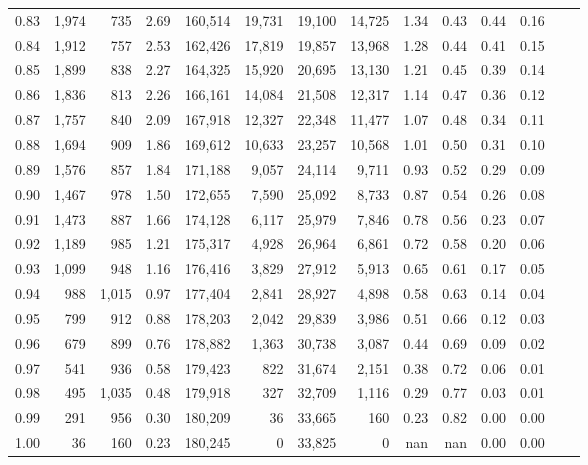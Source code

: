 \begin{tabular}{rrrrrrrrrrrrrr}
0.83 &  1,974 &    735 &    2.69 &  160,514 &   19,731 &  19,100 &  14,725 &  1.34 &  0.43 &  0.44 &      0.16 \\
0.84 &  1,912 &    757 &    2.53 &  162,426 &   17,819 &  19,857 &  13,968 &  1.28 &  0.44 &  0.41 &      0.15 \\
0.85 &  1,899 &    838 &    2.27 &  164,325 &   15,920 &  20,695 &  13,130 &  1.21 &  0.45 &  0.39 &      0.14 \\
0.86 &  1,836 &    813 &    2.26 &  166,161 &   14,084 &  21,508 &  12,317 &  1.14 &  0.47 &  0.36 &      0.12 \\
0.87 &  1,757 &    840 &    2.09 &  167,918 &   12,327 &  22,348 &  11,477 &  1.07 &  0.48 &  0.34 &      0.11 \\
0.88 &  1,694 &    909 &    1.86 &  169,612 &   10,633 &  23,257 &  10,568 &  1.01 &  0.50 &  0.31 &      0.10 \\
0.89 &  1,576 &    857 &    1.84 &  171,188 &    9,057 &  24,114 &   9,711 &  0.93 &  0.52 &  0.29 &      0.09 \\
0.90 &  1,467 &    978 &    1.50 &  172,655 &    7,590 &  25,092 &   8,733 &  0.87 &  0.54 &  0.26 &      0.08 \\
0.91 &  1,473 &    887 &    1.66 &  174,128 &    6,117 &  25,979 &   7,846 &  0.78 &  0.56 &  0.23 &      0.07 \\
0.92 &  1,189 &    985 &    1.21 &  175,317 &    4,928 &  26,964 &   6,861 &  0.72 &  0.58 &  0.20 &      0.06 \\
0.93 &  1,099 &    948 &    1.16 &  176,416 &    3,829 &  27,912 &   5,913 &  0.65 &  0.61 &  0.17 &      0.05 \\
0.94 &    988 &  1,015 &    0.97 &  177,404 &    2,841 &  28,927 &   4,898 &  0.58 &  0.63 &  0.14 &      0.04 \\
0.95 &    799 &    912 &    0.88 &  178,203 &    2,042 &  29,839 &   3,986 &  0.51 &  0.66 &  0.12 &      0.03 \\
0.96 &    679 &    899 &    0.76 &  178,882 &    1,363 &  30,738 &   3,087 &  0.44 &  0.69 &  0.09 &      0.02 \\
0.97 &    541 &    936 &    0.58 &  179,423 &      822 &  31,674 &   2,151 &  0.38 &  0.72 &  0.06 &      0.01 \\
0.98 &    495 &  1,035 &    0.48 &  179,918 &      327 &  32,709 &   1,116 &  0.29 &  0.77 &  0.03 &      0.01 \\
0.99 &    291 &    956 &    0.30 &  180,209 &       36 &  33,665 &     160 &  0.23 &  0.82 &  0.00 &      0.00 \\
1.00 &     36 &    160 &    0.23 &  180,245 &        0 &  33,825 &       0 &   nan &   nan &  0.00 &      0.00 \\
\bottomrule
\end{tabular}
